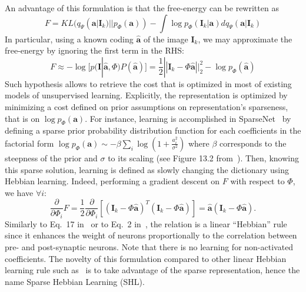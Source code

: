 \documentclass[a4paper, 11pt, draft]{article} %
\newcommand{\coef}{\mathbf{a}} %
\newcommand{\image}{\mathbf{I}} %
\newcommand{\dico}{\Phi} %
\newcommand{\norm}[1]{|\!| #1 |\!|}
\begin{document}
An advantage of this formulation is that the free-energy can be rewritten as
\begin{equation} F = KL( q_\Psi(\coef | \image_k) || p_\dico(\coef) ) - \int \log p_\dico(\image_k | \coef ) dq_\Psi(\coef | \image_k) \end{equation}
In particular, using a known coding $\hat{\coef}$ of the image $\image_k$, we may approximate the free-energy by ignoring the first term in the RHS:
\begin{equation} F \approx - \log [ p(\image | \hat{\coef}, \dico ) P(\hat{\coef}) ] = \frac{1}{2} \norm{\image_k - \dico \hat{\coef}}_2^2 - \log p_\dico(\hat{\coef}) \label{eq:sparse_cost} \end{equation}
Such hypothesis allows to retrieve the cost that is optimized in most of existing models of unsupervised learning. Explicitly, the representation is optimized by minimizing a cost defined on prior assumptions on representation's sparseness, that is on $\log p_\dico( \coef )$. For instance, learning is accomplished in {\sc SparseNet}~\citep{Olshausen97} by defining a sparse prior probability distribution function for each coefficients in the factorial form $\log p_\dico(\coef) \sim -\beta \sum_i \log ( 1 + \frac{a_i^2}{\sigma^2} )$ where $\beta$ corresponds to the steepness of the prior and $\sigma$ to its scaling (see Figure 13.2 from~\citep{Olshausen02}). Then, knowing this sparse solution, learning is defined as slowly changing the dictionary using Hebbian learning.
Indeed, performing a gradient descent on $F$ with respect to $\dico$, we have $\forall i$:
$$ \frac{\partial }{\partial \dico_i } F = \frac{1}{2} \frac{\partial }{\partial \dico_i }[(\image_k - \dico \hat{\coef})^T (\image_k - \dico \hat{\coef})] = \hat{\coef} (\image_k - \dico \hat{\coef}).$$
Similarly to Eq.~17 in~\citep{Olshausen97} or to Eq.~2 in~\citep{Smith06}, the relation is a linear ``Hebbian'' rule~\citep{Hebb49} since it enhances the weight of neurons proportionally to the correlation between pre- and post-synaptic neurons. Note that there is no learning for non-activated coefficients. The novelty of this formulation compared to other linear Hebbian learning rule such as~\citep{Oja82} is to take advantage of the sparse representation, hence the name Sparse Hebbian Learning (SHL).
\end{document}
